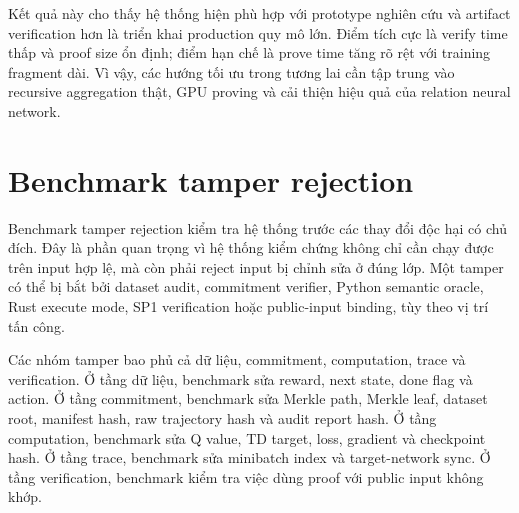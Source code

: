 \documentclass[12pt,a4paper,oneside]{report}
\begin{document}
Kết quả này cho thấy hệ thống hiện phù hợp với prototype nghiên cứu và artifact verification hơn là triển khai production quy mô lớn. Điểm tích cực là verify time thấp và proof size ổn định; điểm hạn chế là prove time tăng rõ rệt với training fragment dài. Vì vậy, các hướng tối ưu trong tương lai cần tập trung vào recursive aggregation thật, GPU proving và cải thiện hiệu quả của relation neural network.

\section{Benchmark tamper rejection}

Benchmark tamper rejection kiểm tra hệ thống trước các thay đổi độc hại có chủ đích. Đây là phần quan trọng vì hệ thống kiểm chứng không chỉ cần chạy được trên input hợp lệ, mà còn phải reject input bị chỉnh sửa ở đúng lớp. Một tamper có thể bị bắt bởi dataset audit, commitment verifier, Python semantic oracle, Rust execute mode, SP1 verification hoặc public-input binding, tùy theo vị trí tấn công.

Các nhóm tamper bao phủ cả dữ liệu, commitment, computation, trace và verification. Ở tầng dữ liệu, benchmark sửa reward, next state, done flag và action. Ở tầng commitment, benchmark sửa Merkle path, Merkle leaf, dataset root, manifest hash, raw trajectory hash và audit report hash. Ở tầng computation, benchmark sửa Q value, TD target, loss, gradient và checkpoint hash. Ở tầng trace, benchmark sửa minibatch index và target-network sync. Ở tầng verification, benchmark kiểm tra việc dùng proof với public input không khớp.
\end{document}
